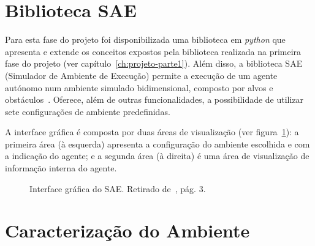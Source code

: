 \section{Biblioteca SAE}\label{sec:biblioteca-sae}

Para esta fase do projeto foi disponibilizada uma biblioteca em \textit{python} que apresenta e extende os conceitos expostos pela biblioteca realizada na primeira fase do projeto (ver capítulo~\ref{ch:projeto-parte1}).
Além disso, a biblioteca SAE (Simulador de Ambiente de Execução) permite a execução de um agente autónomo num ambiente simulado bidimensional, composto por alvos e obstáculos~\cite{isel:iasa:slides:sae-documentacao}.
Oferece, além de outras funcionalidades, a possibilidade de utilizar sete configurações de ambiente predefinidas.

A interface gráfica é composta por duas áreas de visualização (ver figura~\ref{fig:sae-interface-grafica}): a primeira área (à esquerda) apresenta a configuração do ambiente escolhida e com a indicação do agente; e a segunda área (à direita) é uma área de visualização de informação interna do agente.

\begin{figure}[H]
    \begin{center}
    \end{center}
    \caption{Interface gráfica do SAE.
    Retirado de~\cite{isel:iasa:slides:sae-documentacao}, pág.
    3.}\label{fig:sae-interface-grafica}
\end{figure}

\section{Caracterização do Ambiente}\label{sec:caracterizacao-ambiente}

